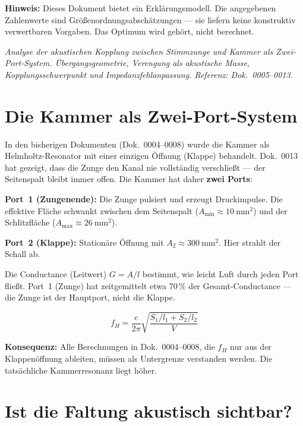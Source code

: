 \documentclass[11pt,a4paper]{article}
\begin{document}
\hbmaketitle
\begin{tcolorbox}[colframe=red!60!black, colback=red!5!white]
\textbf{Hinweis:} Dieses Dokument bietet ein Erklärungsmodell.
Die angegebenen Zahlenwerte sind Größenordnungsabschätzungen ---
sie liefern keine konstruktiv verwertbaren Vorgaben.
Das Optimum wird gehört, nicht berechnet.
\end{tcolorbox}

\noindent\textit{Analyse der akustischen Kopplung zwischen Stimmzunge und Kammer als
Zwei-Port-System. Übergangsgeometrie, Verengung als akustische Masse,
Kopplungsschwerpunkt und Impedanzfehlanpassung.
Referenz: Dok.~0005--0013.}

\section{Die Kammer als Zwei-Port-System}

In den bisherigen Dokumenten (Dok.~0004--0008) wurde die Kammer als
Helmholtz-Resonator mit einer einzigen Öffnung (Klappe) behandelt.
Dok.~0013 hat gezeigt, dass die Zunge den Kanal nie vollständig verschließt ---
der Seitenspalt bleibt immer offen. Die Kammer hat daher \textbf{zwei Ports}:

\textbf{Port~1 (Zungenende):} Die Zunge pulsiert und erzeugt Druckimpulse.
Die effektive Fläche schwankt zwischen dem Seitenspalt
($A_\mathrm{min} \approx 10~\mathrm{mm}^2$) und der Schlitzfläche
($A_\mathrm{max} \approx 26~\mathrm{mm}^2$).

\textbf{Port~2 (Klappe):} Stationäre Öffnung mit $A_2 \approx 300~\mathrm{mm}^2$.
Hier strahlt der Schall ab.

Die Conductance (Leitwert) $G = A/l$ bestimmt, wie leicht Luft durch jeden
Port fließt. Port~1 (Zunge) hat zeitgemittelt etwa 70\,\% der Gesamt-Conductance ---
die Zunge ist der Hauptport, nicht die Klappe.

\begin{equation}
f_H = \frac{c}{2\pi}\sqrt{\frac{S_1/l_1 + S_2/l_2}{V}}
\end{equation}

\begin{tcolorbox}[colframe=keygreen, colback=green!5!white]
\textbf{Konsequenz:} Alle Berechnungen in Dok.~0004--0008, die $f_H$ nur aus der
Klappenöffnung ableiten, müssen als Untergrenze verstanden werden.
Die tatsächliche Kammerresonanz liegt höher.
\end{tcolorbox}

\section{Ist die Faltung akustisch sichtbar?}
\end{document}
